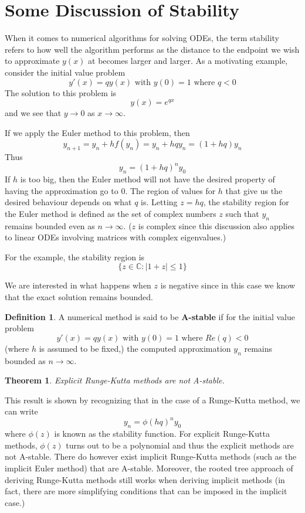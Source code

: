 \documentclass[12pt]{amsart}
\newtheorem*{theorem}{Theorem}
\theoremstyle{definition}
\newtheorem*{definition}{Definition}
\begin{document}
 \pagebreak



   


\section{Some Discussion of Stability}
When it comes to numerical algorithms for solving ODEs, the term stability refers to how well
the algorithm performs as the distance to the endpoint we wish to approximate $y(x)$ at 
becomes larger and larger. As a motivating example, consider the initial value problem
$$y'(x) = qy(x) \mbox{ with } y(0) = 1 \mbox{ where } q < 0$$
The solution to this problem is 
$$y(x) = e^{qx}$$
and we see that $y \rightarrow 0$ as $x \rightarrow \infty$.

If we apply the Euler method to this problem, then
$$y_{n + 1} = y_n + hf(y_n) = y_n + hqy_n = (1 + hq)y_n$$
Thus
$$y_n = (1 + hq)^ny_0$$
If $h$ is too big, then the Euler method will not have the desired property of having the
approximation go to $0$. The region of values for $h$ that give us the desired behaviour depends
on what $q$ is. Letting $z = hq$, the stability region for the Euler method is defined as the set of complex
numbers $z$ such that $y_n$ remains bounded even as $n \to \infty$.
($z$ is complex since this discussion also applies to linear ODEs involving matrices with complex eigenvalues.)

For the example, the stability region is
$$\{z \in \mathbb{C} : |1 + z| \le 1\}$$

We are interested in what happens when $z$ is negative since in this case we know that the exact solution
remains bounded.
\begin{definition}
A numerical method is said to be \textbf{A-stable} if for the initial value problem
$$y'(x) = qy(x) \mbox{ with } y(0) = 1 \mbox{ where } Re(q) < 0$$
(where $h$ is assumed to be fixed,)
the computed approximation $y_n$ remains bounded as $n \to \infty$.
\end{definition}
\begin{theorem}
Explicit Runge-Kutta methods are not A-stable.
\end{theorem}
This result is shown by recognizing that in the case of a Runge-Kutta method, we can write
$$y_n = \phi(hq)^ny_0$$
where $\phi(z)$ is known as the stability function. For explicit Runge-Kutta methods, $\phi(z)$
turns out to be a polynomial and thus the explicit methods are not A-stable.
There do however exist implicit Runge-Kutta methods (such as the implicit Euler method)
that are A-stable. Moreover, the rooted tree approach of deriving Runge-Kutta methods still works
when deriving implicit methods (in fact, there are more simplifying conditions that can be imposed
in the implicit case.)
\pagebreak
\end{document}
